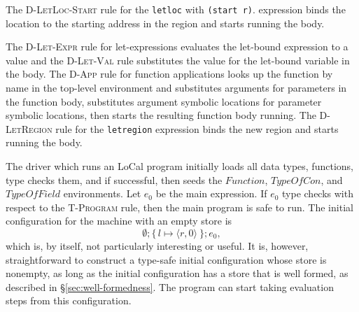 \documentclass[showabstract,showacknowledgments,showpreface,showdedication,school]{iuphd}
\theoremstyle{nonumberplain}
\newcommand{\sysname}[0]{LoCal\xspace}
\newcommand{\ourcalc}[0]{\sysname}
\newcommand{\keywd}[1]{\mathit{#1}}
\newcommand{\sgramwd}[1]{\texttt{#1}}
\newcommand{\skeywd}[1]{\mathit{#1}}
\newcommand{\EXPR}{\keywd{e}}
\newcommand{\loc}{\skeywd{l}}
\newcommand{\concreteloc}[3]{\ensuremath{\langle #1, #2 \rangle ^{#3}}}
\newcommand{\reg}{\skeywd{r}}
\newcommand\set[1]{\{ \, \ensuremath{#1} \,\}}
\newcommand{\typeofcon}{\keywd{TypeOfCon}}
\newcommand{\typeoffield}{\keywd{TypeOfField}}
\newcommand{\dletlocstart}{D-LetLoc-Start}
\newcommand{\dapp}{D-App}
\newcommand{\dletregion}{D-LetRegion}
\newcommand{\tprogram}{T-Program}
\newcommand{\dletexp}{D-Let-Expr}
\newcommand{\dletval}{D-Let-Val}
\newcommand{\secref}[1]{\S\ref{#1}}
\newcommand{\Secref}[1]{\secref{#1}}
\begin{document}
The \textsc{\dletlocstart{}} rule for the \sgramwd{letloc} with \sgramwd{(start r)}.
expression binds the location to the starting address in the region
and starts running the body.

The \textsc{\dletexp{}} rule for let-expressions evaluates the let-bound
expression to a value and the \textsc{\dletval{}} rule substitutes the value for
the let-bound variable in the body.
The \textsc{\dapp{}} rule for function applications looks up the function by name
in the top-level environment and substitutes arguments for parameters
in the function body, substitutes argument symbolic locations for
parameter symbolic locations, then starts the resulting function body
running.
The \textsc{\dletregion{}} rule for the \sgramwd{letregion} expression binds the
new region and starts running the body.

The driver which runs an \ourcalc{} program initially loads all data
types, functions, type checks them, and if successful, then seeds the
$Function$, $\typeofcon$, and $\typeoffield$ environments.
Let $\EXPR_0$ be the main expression.
If $\EXPR_0$ type checks with respect to the \textsc{\tprogram{}} rule, then
the main program is safe to run.
The initial configuration for the machine with an empty store is
\begin{displaymath}
\emptyset; \set{\loc \mapsto \concreteloc{\reg}{0}{}}; \EXPR_0,
\end{displaymath}
which is, by itself, not particularly interesting or useful.
It is, however, straightforward to construct a type-safe initial configuration
whose store is nonempty, as long as the initial configuration
has a store that is well formed, as described in \Secref{sec:well-formedness}.
The program can start taking evaluation steps from this configuration.
\end{document}
